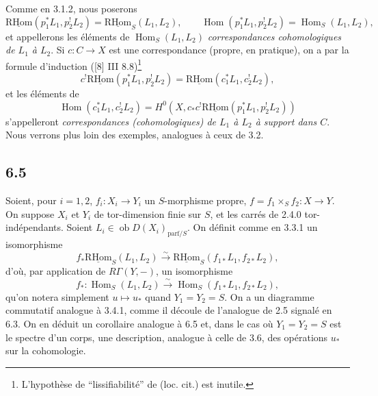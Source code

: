 \documentclass[11pt]{article}
\DeclareMathOperator{\Hom}{Hom}
\providecommand{\RHom}{\mathrm{RHom}}
\providecommand{\uRHom}{\underline{\RHom}}
\providecommand{\RHom}{\mathrm{RHom}}
\providecommand{\Hom}{\operatorname{Hom}}
\providecommand{\RHom}{\mathrm R\mathcal{H}om}
\providecommand{\RHom}{\mathrm{RHom}}
\providecommand{\Hom}{\operatorname{Hom}}
\begin{document}
Comme en 3.1.2, nous poserons
\begin{equation}
\tag{6.4.3}
\uRHom(p_1^*L_1,p_2^!L_2)=\uRHom_S(L_1,L_2),\qquad
\Hom(p_1^*L_1,p_2^!L_2)=\Hom_S(L_1,L_2),
\end{equation}
et appellerons les éléments de $\Hom_S(L_1,L_2)$ \emph{correspondances cohomologiques de $L_1$ à $L_2$}. Si $c:C\to X$ est une correspondance (propre, en pratique), on a par la formule d'induction ([8] III 8.8)\footnote{L'hypothèse de ``lissifiabilité'' de (loc. cit.) est inutile.}
\begin{equation}
\tag{6.4.4}
c^!\uRHom(p_1^*L_1,p_2^!L_2)=\uRHom(c_1^*L_1,c_2^!L_2),
\end{equation}
et les éléments de
\[
\Hom(c_1^*L_1,c_2^!L_2)=H^0(X,c_*c^!\uRHom(p_1^*L_1,p_2^!L_2))
\]
s'appelleront \emph{correspondances (cohomologiques) de $L_1$ à $L_2$ à support dans $C$}. Nous verrons plus loin des exemples, analogues à ceux de 3.2.

\subsection*{6.5}
Soient, pour $i=1,2$, $f_i:X_i\to Y_i$ un $S$-morphisme propre, $f=f_1\times_Sf_2:X\to Y$. On suppose $X_i$ et $Y_i$ de tor-dimension finie sur $S$, et les carrés de 2.4.0 tor-indépendants. Soient $L_i\in\operatorname{ob}D(X_i)_{\mathrm{parf}/S}$. On définit comme en 3.3.1 un isomorphisme
\begin{equation}
\tag{6.5.1}
f_*\uRHom_S(L_1,L_2)\xrightarrow{\sim}\uRHom_S(f_{1*}L_1,f_{2*}L_2),
\end{equation}
d'où, par application de $R\Gamma(Y,-)$, un isomorphisme
\begin{equation}
\tag{6.5.2}
f_*:\Hom_S(L_1,L_2)\xrightarrow{\sim}\Hom_S(f_{1*}L_1,f_{2*}L_2),
\end{equation}
qu'on notera simplement $u\mapsto u_*$ quand $Y_1=Y_2=S$. On a un diagramme commutatif analogue à 3.4.1, comme il découle de l'analogue de 2.5 signalé en 6.3. On en déduit un corollaire analogue à 6.5 et, dans le cas où $Y_1=Y_2=S$ est le spectre d'un corps, une description, analogue à celle de 3.6, des opérations $u_*$ sur la cohomologie.
\end{document}
